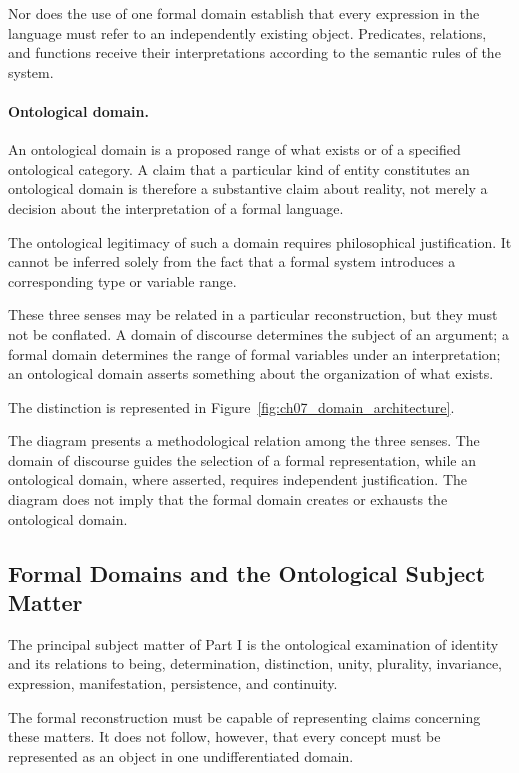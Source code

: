 Nor does the use of one formal domain establish
that every expression in the language must refer
to an independently existing object. Predicates,
relations, and functions receive their interpretations
according to the semantic rules of the system.

\paragraph{Ontological domain.}

An ontological domain is a proposed range of
what exists or of a specified ontological category.
A claim that a particular kind of entity constitutes
an ontological domain is therefore a substantive
claim about reality, not merely a decision about
the interpretation of a formal language.

The ontological legitimacy of such a domain
requires philosophical justification. It cannot
be inferred solely from the fact that a formal
system introduces a corresponding type or
variable range.

These three senses may be related in a particular
reconstruction, but they must not be conflated.
A domain of discourse determines the subject
of an argument; a formal domain determines
the range of formal variables under an
interpretation; an ontological domain asserts
something about the organization of what exists.

The distinction is represented in
Figure~\ref{fig:ch07_domain_architecture}.



The diagram presents a methodological relation
among the three senses. The domain of discourse
guides the selection of a formal representation,
while an ontological domain, where asserted,
requires independent justification. The diagram
does not imply that the formal domain creates
or exhausts the ontological domain.

\subsection{Formal Domains and the Ontological Subject Matter}

The principal subject matter of Part I is the
ontological examination of identity and its
relations to being, determination, distinction,
unity, plurality, invariance, expression,
manifestation, persistence, and continuity.

The formal reconstruction must be capable of
representing claims concerning these matters.
It does not follow, however, that every concept
must be represented as an object in one
undifferentiated domain.

